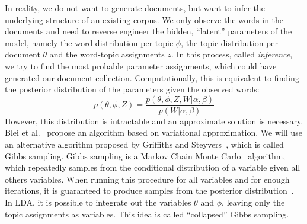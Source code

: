 \documentclass[
        a4paper,
        titlepage,
        twoside,
        parskip,
        numbers=noenddot
        ]{scrbook}
\theoremstyle{break}
\begin{document}
In reality, we do not want to generate documents, but want to infer the underlying structure of an existing corpus.
We only observe the words in the documents and need to reverse engineer the hidden, ``latent'' parameters of the model, namely the word distribution per topic $\phi$, the topic distribution per document $\theta$ and the word-topic assignments $z$.
In this process, called \emph{inference}, we try to find the most probable parameter assignments, which could have generated our document collection.
Computationally, this is equivalent to finding the posterior distribution of the parameters given the observed words:
\begin{equation*}
  p(\theta, \phi, Z) = \frac{p(\theta, \phi, Z, W | \alpha, \beta)}{p(W|\alpha, \beta)}
\end{equation*}
However, this distribution is intractable and an approximate solution is necessary.
Blei et al.~\cite{Blei2003} propose an algorithm based on variational approximation.
We will use an alternative algorithm proposed by Griffiths and Steyvers~\cite{Griffiths2004}, which is called Gibbs sampling.
Gibbs sampling is a Markov Chain Monte Carlo~\cite{Gilks1996} algorithm, which repeatedly samples from the conditional distribution of a variable given all others variables.
When running this procedure for all variables and for enough iterations, it is guaranteed to produce samples from the posterior distribution~\cite{Gilks1996}.
In LDA, it is possible to integrate out the variables $\theta$ and $\phi$, leaving only the topic assignments as variables.
This idea is called ``collapsed'' Gibbs sampling.
\end{document}
